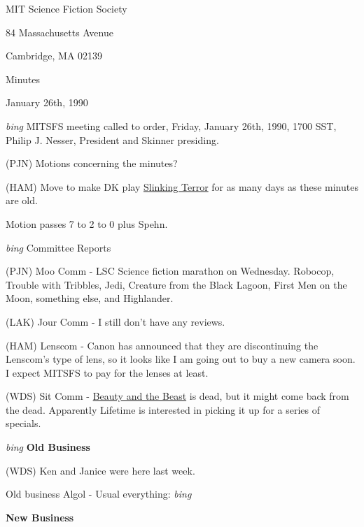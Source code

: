 \setlength{\topmargin}{-0.5in}
\setlength{\oddsidemargin}{-0.1in}
\setlength{\evensidemargin}{-0.1in}
\setlength{\textheight}{9in}
\setlength{\textwidth}{6.5in}



\begin{center}
MIT Science Fiction Society

84 Massachusetts Avenue

Cambridge, MA 02139

\vspace{0.2in}
Minutes

January 26th, 1990

\end{center}
 
\vspace{0.15in}
{\em bing\/}  MITSFS meeting called to order, Friday, January 26th, 1990,
1700 SST, Philip J. Nesser, President and Skinner presiding.

(PJN) Motions concerning the minutes?

(HAM) Move to make DK play \underline{Slinking Terror} for as
many days as these minutes are old.

Motion passes 7 to 2 to 0 plus Spehn.

\vspace{0.15in}
{\em bing\/} {Committee Reports}

(PJN) Moo Comm - LSC Science fiction marathon on Wednesday.  Robocop,
Trouble with Tribbles, Jedi, Creature from the Black Lagoon, First Men
on the Moon, something else, and Highlander.

(LAK) Jour Comm - I still don't have any reviews.

(HAM) Lenscom - Canon has announced that they are discontinuing the
Lenscom's type of lens, so it looks like I am going out to buy a new
camera soon.  I expect MITSFS to pay for the lenses at least.

(WDS) Sit Comm - \underline{Beauty and the Beast} is dead, but it
might come back from the dead.  Apparently Lifetime is interested in
picking it up for a series of specials.

\vspace{0.15in}
{\em bing\/}  {\bf Old Business}

(WDS) Ken and Janice were here last week.

Old business Algol - Usual everything: {\em bing\/}

\vspace{0.15in}
{\bf New Business}

